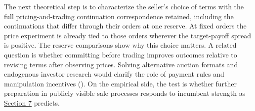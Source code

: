 
The next theoretical step is to characterize the seller's choice of
terms with the full pricing-and-trading continuation correspondence
retained, including the continuations that differ through their orders at one reserve.
At fixed orders the price experiment is already tied to those orders wherever the
target-payoff spread is positive. The reserve comparisons show why this choice matters. A related question is whether committing
before trading improves outcomes relative to revising terms after
observing prices. Solving alternative auction formats and endogenous
investor research would clarify the role of payment rules and
manipulation incentives (). On the empirical side, the test is whether further preparation in publicly visible sale processes responds to incumbent strength as \hyperref[sec-program]{Section 7} predicts.
